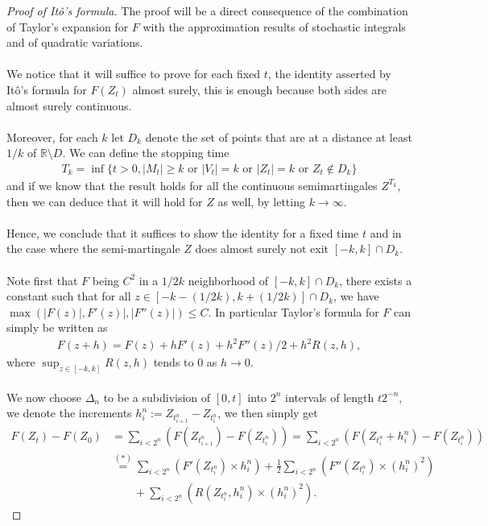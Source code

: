 \documentclass[../mainfile.tex]{subfiles}
\begin{document}
\newpage
\begin{proof}[Proof of Itô's formula] The proof will be a direct consequence of the combination of Taylor's expansion for $F$ with the approximation results of stochastic integrals and of quadratic variations. \\
\\
We notice that it will suffice to prove for each fixed $t$, the identity asserted by Itô's formula for $F(Z_t)$ almost surely,  this is enough because both sides are almost surely continuous. \\
\\
Moreover, for each $k$ let $D_k$ denote the set of points that are at a distance at least $1/k$ of $\mathbb{R}\setminus D$. We can define the stopping time 
\begin{align*}
T_k = \inf \{ t >0 , |M_t| \geq k \text{ or } |V_t|=k \text{ or } |Z_t|=k \text{ or } Z_t \notin D_k \}
\end{align*}
and if we know that the result holds for all the continuous semimartingales $Z^{T_k}$, then we can deduce that it will hold for $Z$ as well, by letting $k \to \infty$. \\
\\
 Hence, we conclude that it suffices to show the identity for a fixed time $t$ and in the case where the semi-martingale $Z$ does almost surely not exit $[-k,k] \cap D_k$. \\
 \\
 Note first that $F$ being $C^2$ in a $1/2k$ neighborhood of $[-k,k] \cap D_k$, there exists a constant such that for all $z \in [-k-(1/2k),k+(1/2k)] \cap D_k$, we have $\max ( |F(z)|, F'(z)|, |F''(z)|) \leq C$. In particular Taylor's formula for $F$ can simply be written as 
 \begin{align*}
 F(z+h)=F(z)+hF'(z)+h^2F''(z)/2 + h^2R(z,h), \tag{*}
 \end{align*}
 where $\sup_{z \in [-k,k]} R(z,h)$ tends to $0$ as $h \to 0$. \\
 \\
We now choose $\Delta_n$ to be a subdivision of $[0,t]$ into $2^n$ intervals of length $t2^{-n}$, we denote the increments $h_i^n:= Z_{t_{i+1}^n}-Z_{t_i^n}$, we then simply get
\begin{align*}
F(Z_t)-F(Z_0)&= \sum_{i<2^n} (F(Z_{t_{i+1}^n})-F(Z_{t_i^n})) =  \sum_{i <2^n} ( F(Z_{t_i^n} + h_i^n)-F(Z_{t_i^n})) \\
&\overset{(*)}= \sum_{i<2^n} (F'(Z_{t_i^n}) \times h_i^n) + \frac{1}{2} \sum_{i < 2^n} (F''(Z_{t_i^n}) \times (h_i^n)^2) \\ & \qquad + \sum_{i < 2^n} (R(Z_{t_i^n},h_i^n) \times (h_i^n)^2).

\end{align*}
\end{proof}
\end{document}
